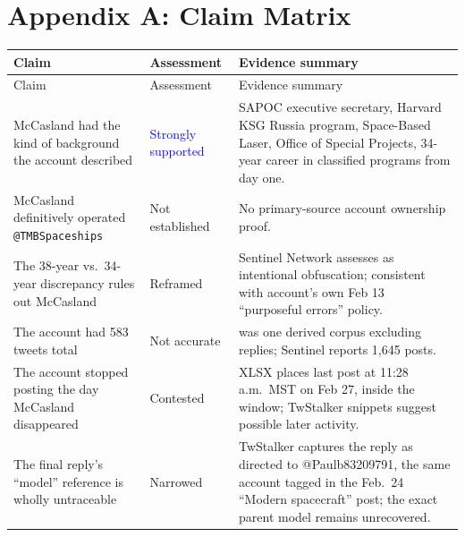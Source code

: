 \documentclass[11pt]{article}
\makeatletter
\newcommand{\account}{\texttt{@TMBSpaceships}}
\makeatother
\begin{document}
\section{Appendix A: Claim Matrix}

\begin{longtable}{@{}>{\raggedright\arraybackslash}p{} >{\raggedright\arraybackslash}p{} >{\raggedright\arraybackslash}p{}@{}}
\toprule
Claim & Assessment & Evidence summary \\
\midrule
\endfirsthead
\toprule
Claim & Assessment & Evidence summary \\
\midrule
\endhead
\bottomrule
\endfoot

McCasland had the kind of background the account described & \textcolor{blue}{Strongly supported} & SAPOC executive secretary, Harvard KSG Russia program, Space-Based Laser, Office of Special Projects, 34-year career in classified programs from day one. \\[4pt]
McCasland definitively operated \account & Not established & No primary-source account ownership proof. \\[4pt]
The 38-year vs.\ 34-year discrepancy rules out McCasland & Reframed & Sentinel Network assesses as intentional obfuscation; consistent with account's own Feb 13 ``purposeful errors'' policy. \\[4pt]
The account had 583 tweets total & Not accurate & 583 was one derived corpus excluding replies; Sentinel reports 1{,}645 posts. \\[4pt]
The account stopped posting the day McCasland disappeared & Contested & XLSX places last post at 11:28 a.m.\ MST on Feb 27, inside the window; TwStalker snippets suggest possible later activity. \\[4pt]
The final reply's ``model'' reference is wholly untraceable & Narrowed & TwStalker captures the reply as directed to @Paulb83209791, the same account tagged in the Feb.\ 24 ``Modern spacecraft'' post; the exact parent model remains unrecovered. \\[4pt]


\end{longtable}
\end{document}

